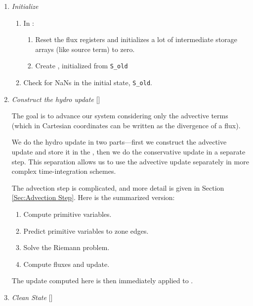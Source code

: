 \begin{enumerate}
\item \label{strang:init} {\em Initialize}

  \begin{enumerate}
  \item In  :
    \begin{enumerate}
    \item Reset the flux registers and initializes a lot of
      intermediate storage arrays (like source term) to zero.

    \item Create , initialized from {\tt S\_old}
    \end{enumerate}

  \item Check for NaNs in the initial state, {\tt S\_old}.
  \end{enumerate}

\item \label{strang:hydro} {\em Construct the hydro update} []

  The goal is to advance our system considering only the advective
  terms (which in Cartesian coordinates can be written as the
  divergence of a flux).

  We do the hydro update in two parts---first we construct the
  advective update and store it in the 
  \multifab, then we do the conservative update in a separate step.  This
  separation allows us to use the advective update separately in more
  complex time-integration schemes.

  The advection step is complicated, and more
  detail is given in Section \ref{Sec:Advection Step}.  Here is the
  summarized version:
  \begin{enumerate}
  \item Compute primitive variables.
  \item Predict primitive variables to zone edges.
  \item Solve the Riemann problem.
  \item Compute fluxes and update.
  \end{enumerate}

  The update computed here is then immediately applied to
  .

\item \label{strang:clean} {\em Clean State} []


\end{enumerate}
